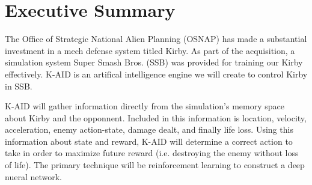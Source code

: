 \chapter*{Executive Summary}

The Office of Strategic National Alien Planning (OSNAP) has made a substantial investment in a mech defense system titled Kirby. 
As part of the acquisition, a simulation system Super Smash Bros. (SSB) was provided for training our Kirby effectively.
K-AID is an artifical intelligence engine we will create to control Kirby in SSB.

K-AID will gather information directly from the simulation's memory space about Kirby and the opponnent.
Included in this information is location, velocity, acceleration, enemy action-state, damage dealt, and finally life loss.
Using this information about state and reward, K-AID will determine a correct action to take in order to maximize future reward (i.e. destroying the enemy without loss of life).
The primary technique will be reinforcement learning to construct a deep nueral network.
